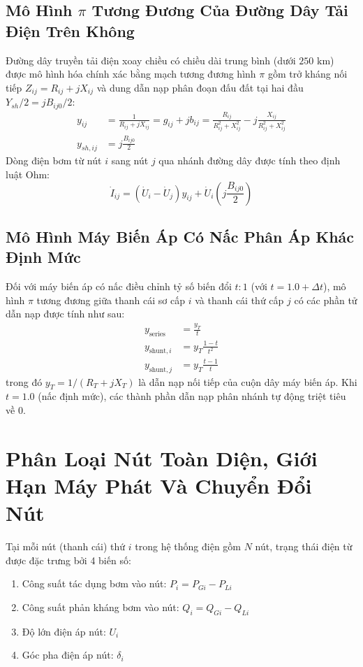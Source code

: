 \documentclass[12pt,a4paper,oneside]{report}
\begin{document}
\subsection{Mô Hình $\pi$ Tương Đương Của Đường Dây Tải Điện Trên Không}
Đường dây truyền tải điện xoay chiều có chiều dài trung bình (dưới $250\text{ km}$) được mô hình hóa chính xác bằng mạch tương đương hình $\pi$ gồm trở kháng nối tiếp $Z_{ij} = R_{ij} + jX_{ij}$ và dung dẫn nạp phân đoạn đấu đất tại hai đầu $Y_{sh}/2 = j B_{ij0}/2$:
\begin{align}
y_{ij} &= \frac{1}{R_{ij} + jX_{ij}} = g_{ij} + jb_{ij} = \frac{R_{ij}}{R_{ij}^2 + X_{ij}^2} - j \frac{X_{ij}}{R_{ij}^2 + X_{ij}^2} \\
y_{sh,ij} &= j \frac{B_{ij0}}{2}
\end{align}
Dòng điện bơm từ nút $i$ sang nút $j$ qua nhánh đường dây được tính theo định luật Ohm:
\begin{equation}
\dot{I}_{ij} = (\dot{U}_i - \dot{U}_j) y_{ij} + \dot{U}_i \left( j \frac{B_{ij0}}{2} \right)
\end{equation}

\subsection{Mô Hình Máy Biến Áp Có Nấc Phân Áp Khác Định Mức}
Đối với máy biến áp có nấc điều chỉnh tỷ số biến đổi $t : 1$ (với $t = 1.0 + \Delta t$), mô hình $\pi$ tương đương giữa thanh cái sơ cấp $i$ và thanh cái thứ cấp $j$ có các phần tử dẫn nạp được tính như sau:
\begin{align}
y_{\text{series}} &= \frac{y_T}{t} \\
y_{\text{shunt},i} &= y_T \frac{1 - t}{t^2} \\
y_{\text{shunt},j} &= y_T \frac{t - 1}{t}
\end{align}
trong đó $y_T = 1 / (R_T + jX_T)$ là dẫn nạp nối tiếp của cuộn dây máy biến áp. Khi $t = 1.0$ (nấc định mức), các thành phần dẫn nạp phân nhánh tự động triệt tiêu về $0$.

\section{Phân Loại Nút Toàn Diện, Giới Hạn Máy Phát Và Chuyển Đổi Nút}
Tại mỗi nút (thanh cái) thứ $i$ trong hệ thống điện gồm $N$ nút, trạng thái điện từ được đặc trưng bởi 4 biến số:
\begin{enumerate}
    \item Công suất tác dụng bơm vào nút: $P_i = P_{Gi} - P_{Li}$
    \item Công suất phản kháng bơm vào nút: $Q_i = Q_{Gi} - Q_{Li}$
    \item Độ lớn điện áp nút: $U_i$
    \item Góc pha điện áp nút: $\delta_i$
\end{enumerate}
\end{document}
